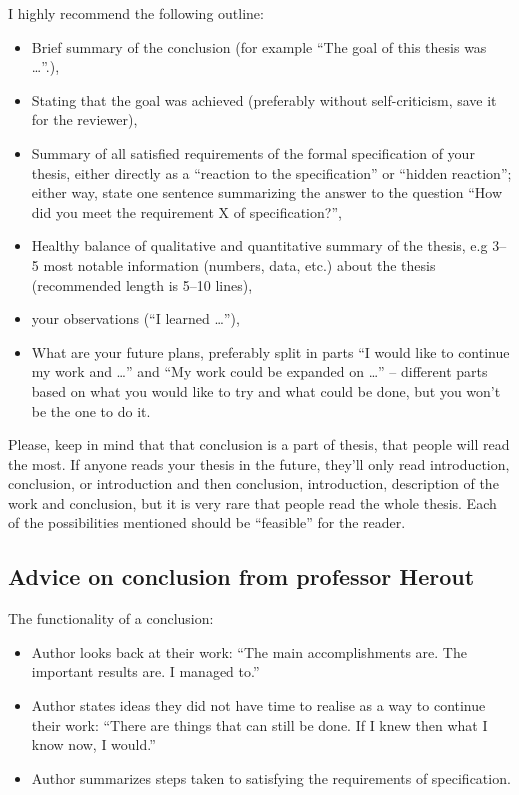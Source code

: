 I highly recommend the following outline:
\begin{itemize}
  \item{Brief summary of the conclusion (for example ``The goal of this thesis was \ldots''.),}
  \item{Stating that the goal was achieved (preferably without self-criticism, save it for the reviewer),}
  \item{Summary of all satisfied requirements of the formal specification of your thesis, either directly as a ``reaction to the specification'' or ``hidden reaction''; either way, state one sentence summarizing the answer to the question ``How did you meet the requirement X of specification?'',}
  \item{Healthy balance of qualitative and quantitative summary of the thesis, e.g 3--5 most notable information (numbers, data, etc.) about the thesis (recommended length is 5--10 lines),}
  \item{your observations (``I learned \ldots''),}
  \item{What are your future plans, preferably split in parts ``I would like to continue my work and \ldots'' and ``My work could be expanded on \ldots'' -- different parts based on what you would like to try and what could be done, but you won't be the one to do it.}
\end{itemize}

Please, keep in mind that that conclusion is a part of thesis, that people will read the most. If anyone reads your thesis in the future, they'll only read introduction, conclusion, or introduction and then conclusion, introduction, description of the work and conclusion, but it is very rare that people read the whole thesis. Each of the possibilities mentioned should be ``feasible'' for the reader.


\subsection*{Advice on conclusion from professor Herout}
The functionality of a conclusion:

\begin{itemize}
  \item{Author looks back at their work: ``The main accomplishments are. The important results are. I managed to.''}
  \item{Author states ideas they did not have time to realise as a way to continue their work: ``There are things that can still be done. If I knew then what I know now, I would.''}
  \item{Author summarizes steps taken to satisfying the requirements of specification.}
\end{itemize}

